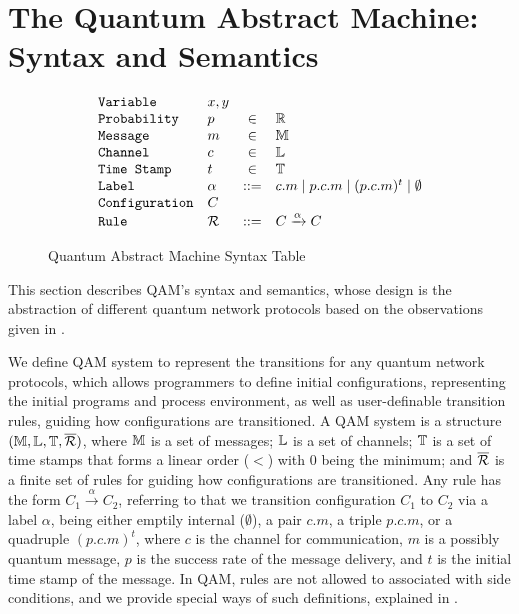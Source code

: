 \section{The Quantum Abstract Machine:  Syntax and Semantics} \label{sec:qam}

\begin{figure}[t]
{\small
  \[\begin{array}{llcl} 
      \texttt{Variable} & x,y \\
      \texttt{Probability} & p &\in &\mathbb{R}\\
      \texttt{Message} & m &\in& \mathbb{M}\\
    \texttt{Channel} & c &\in& \mathbb{L}\\
    \texttt{Time Stamp} & t &\in& \mathbb{T}\\
    \texttt{Label} & \alpha &::=& c.m \mid p.c.m \mid (p.c.m)^t \mid \emptyset\\
      \texttt{Configuration} & C & \\
      \texttt{Rule} & \mathcal{R} & ::= & C \xrightarrow{\alpha} C 
    \end{array}
  \]
}
\caption{Quantum Abstract Machine Syntax Table}
  \label{fig:q-pi-syntax}
\end{figure}

This section describes QAM's syntax and semantics, whose design is the abstraction of different quantum network protocols based on the observations given in .

We define QAM system to represent the transitions for any quantum network protocols, which allows programmers to define initial configurations, representing the initial programs and process environment, as well as user-definable transition rules, guiding how configurations are transitioned. A QAM system is a structure $(\mathbb{M},\mathbb{L},\mathbb{T},\overline{\mathcal{R}})$,
where $\mathbb{M}$ is a set of messages;
$\mathbb{L}$ is a set of channels;
$\mathbb{T}$ is a set of time stamps that forms a linear order ($<$) with $0$ being the minimum;
and $\overline{\mathcal{R}}$ is a finite set of rules for guiding how configurations are transitioned. 
Any rule has the form $C_1 \xrightarrow{\alpha} C_2$, referring to that we transition configuration $C_1$ to $C_2$ via a label $\alpha$, being either emptily internal ($\emptyset$), a pair $c.m$, a triple $p.c.m$, or a quadruple $(p.c.m)^t$, where $c$ is the channel for communication, $m$ is a possibly quantum message, $p$ is the success rate of the message delivery, and $t$ is the initial time stamp of the message. In QAM, rules are not allowed to associated with side conditions, and we provide special ways of such definitions, explained in .

